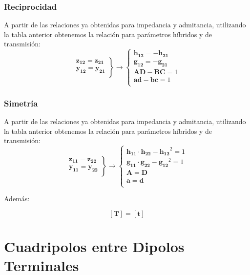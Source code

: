 \subsubsection{Reciprocidad}
\label{sec:org8de0a87}
A partir de las relaciones ya obtenidas para impedancia y admitancia, utilizando la tabla anterior obtenemos la relación para parámetros híbridos y de transmisión:
\[
\left.
\begin{array}{l}
  \mathbf{z_{12}} = \mathbf{z_{21}}\\
  \mathbf{y_{12}} = \mathbf{y_{21}}\\
\end{array}
\right\} \rightarrow
\left\{
\begin{array}{l}
  \mathbf{h_{12}} = - \mathbf{h_{21}}\\
  \mathbf{g_{12}} = - \mathbf{g_{21}}\\
  \mathbf{A} \mathbf{D} - \mathbf{B} \mathbf{C} = 1\\
  \mathbf{a} \mathbf{d} - \mathbf{b} \mathbf{c} = 1\\
\end{array}
\right.
\]


\subsubsection{Simetría}
\label{sec:org32ff848}
A partir de las relaciones ya obtenidas para impedancia y admitancia, utilizando la tabla anterior obtenemos la relación para parámetros híbridos y de transmisión:
\[
\left.
\begin{array}{l}
  \mathbf{z_{11}} = \mathbf{z_{22}}\\
  \mathbf{y_{11}} = \mathbf{y_{22}}\\
\end{array}
\right\} \rightarrow
\left\{
\begin{array}{l}
  \mathbf{h_{11}} \cdot \mathbf{h_{22}} - \mathbf{h_{12}}^2 = 1\\
  \mathbf{g_{11}} \cdot \mathbf{g_{22}} - \mathbf{g_{12}}^2 = 1\\
  \mathbf{A} =  \mathbf{D}\\
  \mathbf{a} =  \mathbf{d}\\
\end{array}
\right.
\]

Además:

\[
  \boxed{[\mathbf{T}] = [\mathbf{t}]}
\]


\section{Cuadripolos entre Dipolos Terminales}
\label{sec:org4eb70ca}

